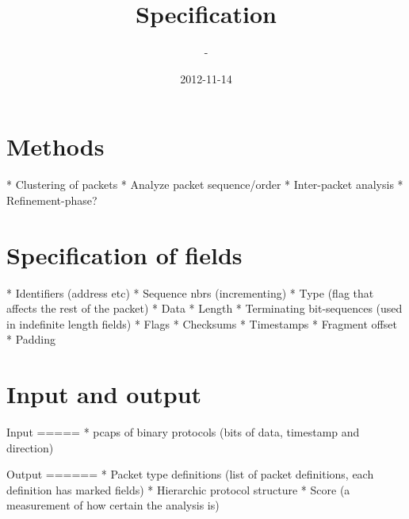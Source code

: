 \documentclass[]{article}
\title{Specification}
\author{-}
\date{2012-11-14}
\begin{document}
\ifpdf
{}
\else
{}
\fi

\clearpage

\section{Methods}

* Clustering of packets
* Analyze packet sequence/order
* Inter-packet analysis
* Refinement-phase?


\section{Specification of fields}

* Identifiers (address etc)
* Sequence nbrs (incrementing)
* Type (flag that affects the rest of the packet)
* Data
* Length
* Terminating bit-sequences (used in indefinite length fields)
* Flags
* Checksums
* Timestamps
* Fragment offset
* Padding

\section{Input and output}

Input
=====
* pcaps of binary protocols (bits of data, timestamp and direction)

Output
======
* Packet type definitions (list of packet definitions, each definition has marked fields)
* Hierarchic protocol structure
* Score (a measurement of how certain the analysis is)
    
\end{document}
